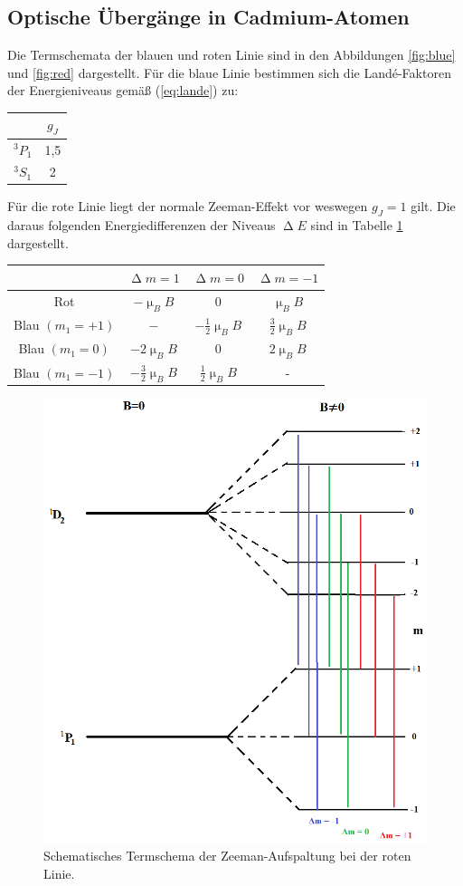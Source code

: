 \subsection{Optische Übergänge in Cadmium-Atomen}
Die Termschemata der blauen und roten Linie sind in den Abbildungen \ref{fig:blue} und \ref{fig:red} dargestellt. Für die blaue Linie bestimmen sich die Landé-Faktoren der Energieniveaus gemäß (\ref{eq:lande}) zu:
\begin{table}[H]
\centering
\begin{tabular}{c|c}
 & $g_J$\\
 \hline
$^3P_1$  & 1{,}5 \\
$^3S_1$&2
\end{tabular}
\end{table}
Für die rote Linie liegt der normale Zeeman-Effekt vor weswegen $g_J=1$ gilt. Die daraus folgenden Energiedifferenzen der Niveaus $\upDelta E$ sind in Tabelle \ref{tab:ediff} dargestellt.
\begin{table}[]
\centering
\begin{tabular}{c|ccc}
 &$\upDelta m = 1$&$\upDelta m=0$&$\upDelta m = -1$ \\
 \hline
Rot&$-\upmu_BB$&$0$&$\upmu_BB$\\
Blau $(m_1=+1)$&$-$&$-\frac{1}{2}\upmu_BB$&$\frac{3}{2}\upmu_BB$\\
Blau $(m_1=0)$&$-2\upmu_BB$&$0$&$2\upmu_BB$\\
Blau $(m_1=-1)$&$-\frac{3}{2}\upmu_BB$&$\frac{1}{2}\upmu_BB$&-
\end{tabular}
\label{tab:ediff}
\end{table}
\begin{figure}
  \centering
  \includegraphics[scale=0.4]{Bilder/1Termschema.png}
  \caption{Schematisches Termschema der Zeeman-Aufspaltung bei der roten Linie.}
\end{figure}
